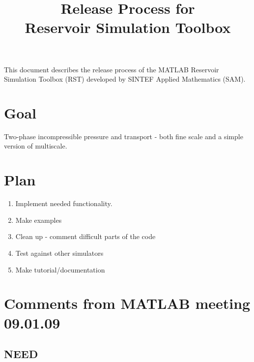 \documentclass[11pt,twoside,english]{scrartcl}
\title {Release Process for\\{\MATLAB} Reservoir Simulation Toolbox}
\author{{\SAM}}
\date{\svndate}
\newcommand{\SINTEF}  {\textsc{SINTEF}}
\newcommand{\MATLAB}  {\textsc{MATLAB}}
\newcommand{\rstroot} {\texttt{\$RSTROOT}}
\begin{document}
\maketitle\thispagestyle{empty}
This document describes the release process of the {\MATLAB} Reservoir Simulation Toolbox (RST) developed
by {\SINTEF} Applied Mathematics (SAM).  



\section{Goal}
Two-phase incompressible pressure and transport - both fine scale and
a simple version of multiscale. 


\section{Plan}


\begin{enumerate}

\item Implement needed functionality.

\item Make examples

\item Clean up - comment difficult parts of the code

\item Test against other simulators

\item Make tutorial/documentation

\end{enumerate}

\section{Comments from {\MATLAB} meeting 09.01.09}

\subsection{NEED}
\end{document}
